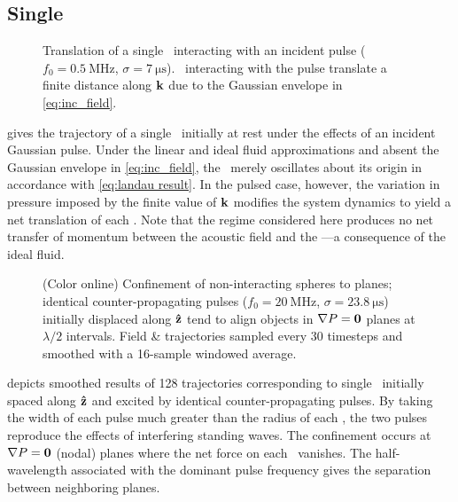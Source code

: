 \subsection{Single \bubbles}

\begin{figure}
  \centering
  
  \caption{\label{fig:single_displacement}Translation of a single \bubble\ interacting with an incident pulse ($f_0 = \SI{0.5}{\mega\hertz}$, $\sigma = \SI{7}{\micro\second}$). \Bubbles\ interacting with the pulse translate a finite distance along $\vb{k}$ due to the Gaussian envelope in \cref{eq:inc_field}.}
\end{figure}

 gives the trajectory of a single \bubble\ initially at rest under the effects of an incident Gaussian pulse.
Under the linear and ideal fluid approximations and absent the Gaussian envelope in \cref{eq:inc_field}, the \bubble\ merely oscillates about its origin in accordance with \cref{eq:landau result}.
In the pulsed case, however, the variation in pressure imposed by the finite value of $\vb{k}$ modifies the system dynamics to yield a net translation of each \bubble.
Note that the regime considered here produces no net transfer of momentum between the acoustic field and the \bubble---a consequence of the ideal fluid.

\begin{figure}
  \centering
  
  \caption{\label{fig:planar_confinement}
  (Color online) Confinement of non-interacting spheres to planes; identical counter-propagating pulses ($f_0 = \SI{20}{\mega\hertz}$, $\sigma = \SI{23.8}{\micro\second}$) initially displaced along $\vu{z}$ tend to align objects in $\nabla P = \vb{0}$ planes at $\lambda/2$ intervals.
    Field \& trajectories sampled every 30 timesteps and smoothed with a 16-sample windowed average.
  }
\end{figure}

 depicts smoothed results of 128 trajectories corresponding to single \bubbles\ initially spaced along $\vu{z}$ and excited by identical counter-propagating pulses. 
By taking the width of each pulse much greater than the radius of each \bubble, the two pulses reproduce the effects of interfering standing waves. 
The confinement occurs at $\nabla P = \vb{0}$ (nodal) planes where the net force on each \bubble\ vanishes.
The half-wavelength associated with the dominant pulse frequency gives the separation between neighboring planes.

